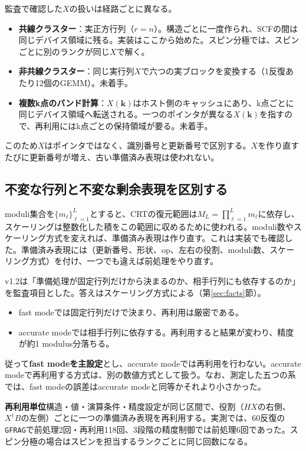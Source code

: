 \documentclass[a4paper,11pt]{ltjsarticle}
\newcommand{\code}[1]{\texttt{#1}}
\begin{document}
監査で確認した$X$の扱いは経路ごとに異なる。
\begin{itemize}
\item \textbf{共線クラスター}：実正方行列（$r=n$）。構造ごとに一度作られ、SCFの間は同じデバイス領域に残る。実装はここから始めた。スピン分極では、スピンごとに別のランクが同じ$X$で解く。
\item \textbf{非共線クラスター}：同じ実行列$X$で六つの実ブロックを変換する（1反復あたり12個のGEMM）。未着手。
\item \textbf{複数k点のバンド計算}：$X(\bm k)$はホスト側のキャッシュにあり、k点ごとに同じデバイス領域へ転送される。一つのポインタが異なる$X(\bm k)$を指すので、再利用にはk点ごとの保持領域が要る。未着手。
\end{itemize}
このため$X$はポインタではなく、識別番号と更新番号で区別する。$X$を作り直すたびに更新番号が増え、古い準備済み表現は使われない。

\subsection{不変な行列と不変な剰余表現を区別する}
moduli集合を$\{m_\ell\}_{\ell=1}^{L}$とすると、CRTの復元範囲は$M_L=\prod_{\ell=1}^{L}m_\ell$に依存し、スケーリングは整数化した積をこの範囲に収めるために使われる\cite{ozaki}。moduli数やスケーリング方式を変えれば、準備済み表現は作り直す。これは実装でも確認した。準備済み表現には（更新番号、形状、op、左右の役割、moduli数、スケーリング方式）を付け、一つでも違えば前処理をやり直す。

v1.2は「準備処理が固定行列だけから決まるのか、相手行列にも依存するのか」を監査項目とした。答えはスケーリング方式による（第\ref{sec:facts}節）。
\begin{itemize}
\item fast modeでは固定行列だけで決まり、再利用は厳密である。
\item accurate modeでは相手行列に依存する。再利用すると結果が変わり、精度が約1 modulus分落ちる。
\end{itemize}
従って\textbf{fast modeを主設定}とし、accurate modeでは再利用を行わない。accurate modeで再利用する方式は、別の数値方式として扱う。なお、測定した五つの系では、fast modeの誤差はaccurate modeと同等かそれより小さかった。

\begin{keybox}
\textbf{再利用単位}\quad 構造・値・演算条件・精度設定が同じ区間で、役割（$HX$の右側、$X^\dagger B$の左側）ごとに一つの準備済み表現を再利用する。実測では、60反復の\code{GFRAG}で前処理2回・再利用118回、3段階の精度制御では前処理6回であった。スピン分極の場合はスピンを担当するランクごとに同じ回数になる。
\end{keybox}
\end{document}
